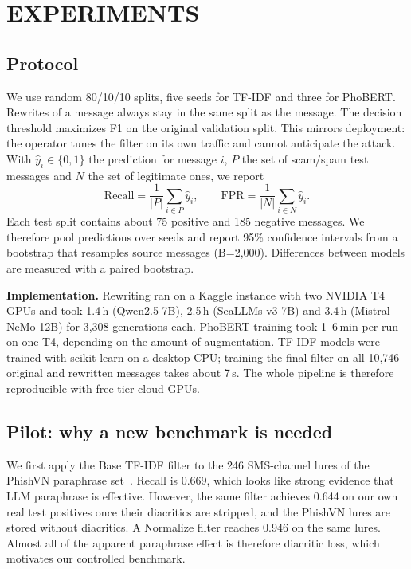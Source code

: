 \documentclass[11pt,a4paper]{article}
\begin{document}
\section{EXPERIMENTS}\label{sec:exp}
\subsection{Protocol}
We use random 80/10/10 splits, five seeds for TF-IDF and three for PhoBERT. Rewrites of a message always stay in the same split as the message. The decision threshold maximizes F1 on the original validation split. This mirrors deployment: the operator tunes the filter on its own traffic and cannot anticipate the attack. With $\hat{y}_i \in \{0, 1\}$ the prediction for message $i$, $P$ the set of scam/spam test messages and $N$ the set of legitimate ones, we report
\begin{equation}
\mathrm{Recall} = \frac{1}{|P|}\sum_{i \in P}\hat{y}_i, \qquad \mathrm{FPR} = \frac{1}{|N|}\sum_{i \in N}\hat{y}_i .
\label{eq:metrics}
\end{equation}
Each test split contains about 75 positive and 185 negative messages. We therefore pool predictions over seeds and report 95\% confidence intervals from a bootstrap that resamples source messages (B=2,000). Differences between models are measured with a paired bootstrap.

\textbf{Implementation.} Rewriting ran on a Kaggle instance with two NVIDIA T4 GPUs and took 1.4\,h (Qwen2.5-7B), 2.5\,h (SeaLLMs-v3-7B) and 3.4\,h (Mistral-NeMo-12B) for 3,308 generations each. PhoBERT training took 1--6\,min per run on one T4, depending on the amount of augmentation. TF-IDF models were trained with scikit-learn on a desktop CPU; training the final filter on all 10,746 original and rewritten messages takes about 7\,s. The whole pipeline is therefore reproducible with free-tier cloud GPUs.

\subsection{Pilot: why a new benchmark is needed}\label{sec:pilot}
We first apply the Base TF-IDF filter to the 246 SMS-channel lures of the PhishVN paraphrase set~\cite{vu2026phishvn}. Recall is 0.669, which looks like strong evidence that LLM paraphrase is effective. However, the same filter achieves 0.644 on our own real test positives once their diacritics are stripped, and the PhishVN lures are stored without diacritics. A Normalize filter reaches 0.946 on the same lures. Almost all of the apparent paraphrase effect is therefore diacritic loss, which motivates our controlled benchmark.
\end{document}
